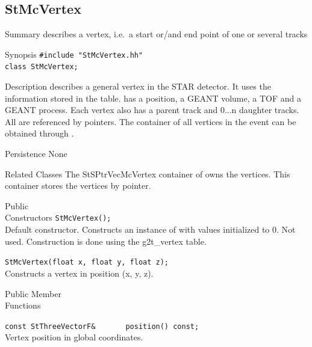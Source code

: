 \clearpage
%
%
\subsection{StMcVertex}
\label{sec:StMcVertex}
\begin{Entry}
\item[Summary]
     describes a vertex, i.e.~a start or/and end point of one
    or several tracks

\item[Synopsis]
    \verb+#include "StMcVertex.hh"+\\
    \verb+class StMcVertex;+\\

\item[Description]
         describes a general vertex in the STAR detector.
    It uses the information stored in the 
    table.  has a position, a
    GEANT volume, a TOF and a GEANT process. Each vertex also has
    a parent track and 0...n daughter tracks. All are
    referenced by pointers.
    The container of all vertices in the event can be obtained
    through .

\item[Persistence]
    None

\item[Related Classes]
    The StSPtrVecMcVertex container of  owns the
    vertices. This container stores the
    vertices by pointer. 

\item[Public\\ Constructors]
    \verb+StMcVertex();+\\
    Default constructor. Constructs an instance of  with
    values initialized to 0.  Not used.  Construction is done
    using the g2t\_vertex table.

    \verb+StMcVertex(float x, float y, float z);+\\
    Constructs a vertex in position (x, y, z).

\item[Public Member\\ Functions]

    \verb+const StThreeVectorF&       position() const;+\\
    Vertex position in global coordinates.


\end{Entry}
